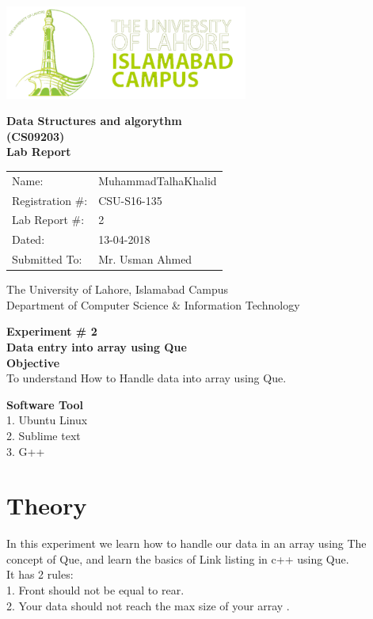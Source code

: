 \documentclass[11pt]{article}            %
\begin{document}
\begin{titlepage}
    \centering
  \vfill
    \includegraphics[width=8cm]{uni_logo.png} \\ 
	\vskip2cm
    {\bfseries\Large
	Data Structures and algorythm  \\ (CS09203)\\
	
	\vskip2cm
	Lab Report 
	 
	\vskip2cm
	}    

\begin{center}
\begin{tabular}{ l l  } 

Name: & MuhammadTalhaKhalid \\ 
Registration \#: &CSU-S16-135\\ 
Lab Report \#: & 2 \\ 
 Dated:& 13-04-2018\\ 
Submitted To:& Mr. Usman Ahmed\\ 

\end{tabular}
\end{center}
    \vfill
    The University of Lahore, Islamabad Campus\\
Department of Computer Science \& Information Technology
\end{titlepage}


    
    {\bfseries\Large
\centering
	Experiment \# 2 \\

Data entry into array using Que \\
	
	}    
 \vskip1cm
 \textbf {Objective}\\  To understand How to Handle data into array  using Que.
 
 \textbf {Software Tool} \\
1. Ubuntu Linux \\
2. Sublime text\\
3. G++ \\

\section{Theory }              
In this experiment we learn how to handle our data in an array using The concept of Que,  and  learn the basics of  Link listing in c++ using Que.\\
It has 2 rules:\\
1.	Front should not be equal to rear.\\
2.	Your data should not reach the max  size of your array  .\\ \\
\end{document}
